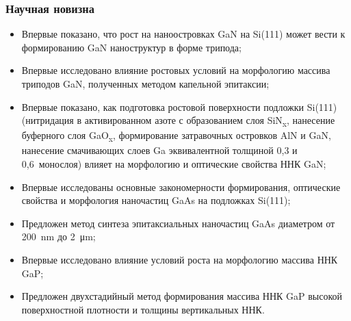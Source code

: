 \begin{frame}
    \frametitle{Научная новизна}
    \begin{itemize}
\item Впервые показано, что рост на наноостровках GaN на Si(111) может вести к формированию GaN наноструктур в форме трипода;
\item Впервые исследовано влияние ростовых условий на морфологию массива триподов GaN, полученных методом капельной эпитаксии;
\item Впервые показано, как подготовка ростовой поверхности подложки Si(111) (нитридация в активированном азоте с образованием слоя SiN\textsubscript{x}, нанесение буферного слоя GaO\textsubscript{x}, формирование затравочных островков AlN и GaN, нанесение смачивающих слоев Ga эквивалентной толщиной 0,3 и 0,6~монослоя) влияет на морфологию и оптические свойства ННК GaN;
\item	Впервые исследованы основные закономерности формирования, оптические свойства и морфология наночастиц GaAs на подложках Si(111);
\item	Предложен метод синтеза эпитаксиальных наночастиц GaAs диаметром от 200~\si{\nano\meter} до 2~\si{\micro\metre};
\item	Впервые исследовано влияние условий роста на морфологию массива ННК GaP;
\item Предложен двухстадийный метод формирования массива ННК GaP высокой поверхностной плотности и толщины вертикальных ННК.
    \end{itemize}
\end{frame}


